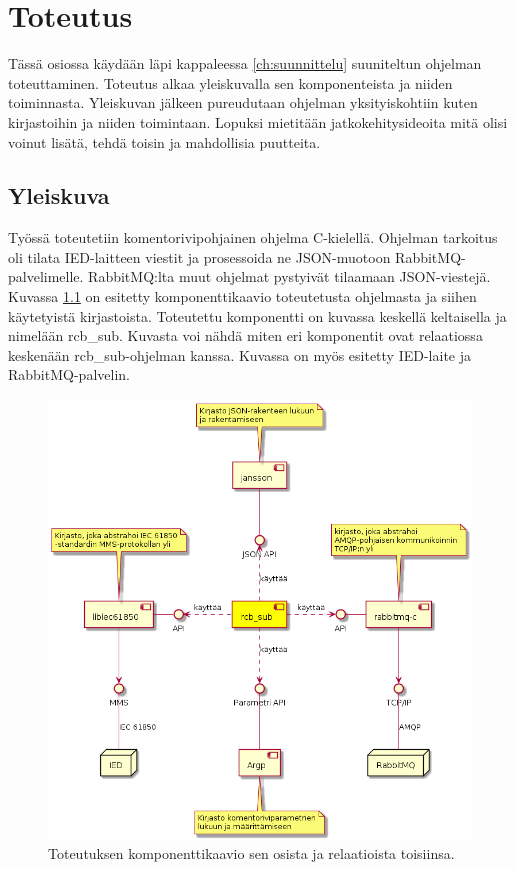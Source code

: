 \chapter{Toteutus}
\label{ch:toteutus}
Tässä osiossa käydään läpi kappaleessa \ref{ch:suunnittelu} suuniteltun ohjelman toteuttaminen. Toteutus alkaa yleiskuvalla sen komponenteista ja niiden toiminnasta. Yleiskuvan jälkeen pureudutaan ohjelman yksityiskohtiin kuten kirjastoihin ja niiden toimintaan. Lopuksi mietitään jatkokehitysideoita mitä olisi voinut lisätä, tehdä toisin ja mahdollisia puutteita.


\section{Yleiskuva}
\label{ch:rcb-sub-yleiskuva}
Työssä toteutetiin komentorivipohjainen ohjelma C-kielellä. Ohjelman tarkoitus oli tilata IED-laitteen viestit ja prosessoida ne JSON-muotoon RabbitMQ-palvelimelle. RabbitMQ:lta muut ohjelmat pystyivät tilaamaan JSON-viestejä. Kuvassa \ref{fig:rcb-sub-komponenttikaavio} on esitetty komponenttikaavio  toteutetusta ohjelmasta ja siihen käytetyistä kirjastoista. Toteutettu komponentti on kuvassa keskellä keltaisella ja nimelään rcb\_sub. Kuvasta voi nähdä miten eri komponentit ovat relaatiossa keskenään rcb\_sub-ohjelman kanssa. Kuvassa on myös esitetty IED-laite ja RabbitMQ-palvelin.

\begin{figure}[ht!]
	\includegraphics[width=1\textwidth]{pictures/rcb-sub-component-diagram.png}
	\caption{Toteutuksen komponenttikaavio sen osista ja relaatioista toisiinsa.}
	\label{fig:rcb-sub-komponenttikaavio}
\end{figure}

